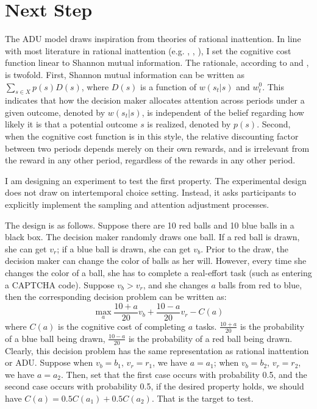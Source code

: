 \documentclass[
  12pt,
]{article}
\begin{document}
\hypertarget{next-step}{%
\section{\texorpdfstring{Next Step
\label{schedule}}{Next Step }}\label{next-step}}

The ADU model draws inspiration from theories of rational inattention.
In line with most literature in rational inattention (e.g.
\citet{matejka_rational_2015}, \citet{jung_discrete_2019},
\citet{mackowiak_rational_2023}), I set the cognitive cost function
linear to Shannon mutual information. The rationale, according to
\citet{matejka_rational_2015} and \citet{caplin_rationally_2022}, is
twofold. First, Shannon mutual information can be written as
\(\sum_{s\in X} p(s) D(s)\), where \(D(s)\) is a function of
\(w(s_t|s)\) and \(w^0_t\). This indicates that how the decision maker
allocates attention across periods under a given outcome, denoted by
\(w(s_t|s)\), is independent of the belief regarding how likely it is
that a potential outcome \(s\) is realized, denoted by \(p(s)\). Second,
when the cognitive cost function is in this style, the relative
discounting factor between two periods depends merely on their own
rewards, and is irrelevant from the reward in any other period,
regardless of the rewards in any other period.

I am designing an experiment to test the first property. The
experimental design does not draw on intertemporal choice setting.
Instead, it asks participants to explicitly implement the sampling and
attention adjustment processes.

The design is as follows. Suppose there are 10 red balls and 10 blue
balls in a black box. The decision maker randomly draws one ball. If a
red ball is drawn, she can get \(v_r\); if a blue ball is drawn, she can
get \(v_b\). Prior to the draw, the decision maker can change the color
of balls as her will. However, every time she changes the color of a
ball, she has to complete a real-effort task (such as entering a CAPTCHA
code). Suppose \(v_b>v_r\), and she changes \(a\) balls from red to
blue, then the corresponding decision problem can be written as: \[
\max_a \frac{10+a}{20} v_b + \frac{10-a}{20} v_r - C(a)
\]where \(C(a)\) is the cognitive cost of completing \(a\) tasks.
\(\frac{10+a}{20}\) is the probability of a blue ball being drawn,
\(\frac{10-a}{20}\) is the probability of a red ball being drawn.
Clearly, this decision problem has the same representation as rational
inattention or ADU. Suppose when \(v_b = b_1\), \(v_r = r_1\), we have
\(a=a_1\); when \(v_b = b_2\), \(v_r = r_2\), we have \(a=a_2\). Then,
set that the first case occurs with probability 0.5, and the second case
occurs with probability 0.5, if the desired property holds, we should
have \(C(a)=0.5C(a_1)+0.5C(a_2)\). That is the target to test.
\end{document}
